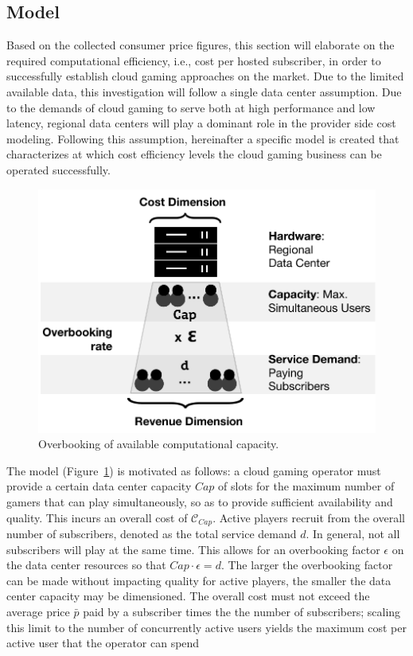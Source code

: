 \subsection{Model}

Based on the collected consumer price figures, this section will elaborate on the required computational efficiency, i.e., cost per hosted subscriber, in order to successfully establish cloud gaming approaches on the market. Due to the limited available data, this investigation will follow a single data center assumption. Due to the demands of cloud gaming to serve both at high performance and low latency, regional data centers will play a dominant role in the provider side cost modeling. Following this assumption, hereinafter a specific model is created that characterizes at which cost efficiency levels the cloud gaming business can be operated successfully.

\begin{figure}[!t]
	\centering
	\includegraphics[width=0.75\columnwidth]{images/overbooking_datacenterNG.pdf}
	\caption{Overbooking of available computational capacity.}
\label{fig:overbooking_datacenter}
\end{figure}

The model (Figure~\ref{fig:overbooking_datacenter}) is motivated as follows: a cloud gaming operator must provide a certain data center capacity $Cap$ of slots for the maximum number of gamers that can play simultaneously, so as to provide sufficient availability and quality. This incurs an overall cost of $\mathcal{C}_{Cap}$. Active players recruit from the overall number of subscribers, denoted as the total service demand $d$. In general, not all subscribers will play at the same time. This allows for an overbooking factor $\epsilon$ on the data center resources so that $Cap \cdot \epsilon = d$. The larger the overbooking factor can be made without impacting quality for active players, the smaller the data center capacity may be dimensioned. %
The overall cost must not exceed the average price $\bar{p}$ paid by a subscriber times the the number of subscribers;
scaling this limit to the number of concurrently active users yields the maximum cost per active user that the operator can spend

